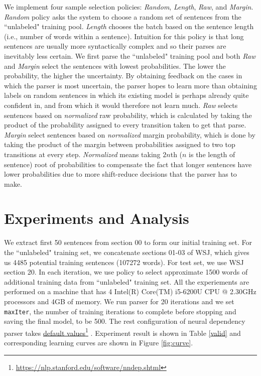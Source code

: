 \documentclass[11pt,letterpaper]{article}
\newcommand\fnurl[2]{%
  \href{#2}{#1}\footnote{\url{#2}}%
}
\begin{document}
We implement four sample selection policies: \emph{Random}, \emph{Length}, \emph{Raw}, and \emph{Margin}. \emph{Random} policy
asks the system to choose a random set of sentences from the ``unlabeled" training pool. \emph{Length} chooses the batch based on
the sentence length (i.e., number of words within a sentence). Intuition for this policy is that 
long sentences are usually more syntactically complex and so their parses are inevitably less certain. 
We first parse the ``unlabeled" training pool and both \emph{Raw} and \emph{Margin} select the sentences
with lowest probabilities. The lower the probability, the higher the uncertainty. By obtaining feedback on the cases 
in which the parser is most uncertain, the parser hopes to learn more than obtaining labels on random sentences in which 
its existing model is perhaps already quite confident in, and from which it would therefore not learn much. 
\emph{Raw} selects sentences based on \emph{normalized} raw probability, which is calculated by taking 
the product of the probability assigned to every transition taken to get that parse.
\emph{Margin} select sentences based on \emph{normalized} margin probability, which is done by
taking the product of the margin between probabilities assigned to two top transitions at every step. 
\emph{Normalized} means taking $2n$th ($n$ is the length of sentence) root of probabilities to compensate the fact
that longer sentences have lower probabilities due to more shift-reduce decisions that the parser has to make.

\section{Experiments and Analysis}
\label{ssec:layout}

We extract first 50 sentences from section 00 to form our initial training set. For the ``unlabeled" training set, 
we concatenate sections 01-03 of WSJ, which gives us 4485 potential training sentences (107272 words). For test set,
we use WSJ section 20. In each iteration, we use policy to select approximate 1500 words of additional training data
from ``unlabeled" training set. All the experiements are performed on
a machine that has 4 Intel(R) Core(TM) i5-6200U CPU @ 2.30GHz processors and 4GB of memory. 
We run parser for 20 iterations and we set \texttt{maxIter}, the number of training iterations to complete before stopping
and saving the final model, to be 500. The rest configuration of neural dependency parser takes \fnurl{default 
values}{https://nlp.stanford.edu/software/nndep.shtml}.
Experiment result is shown in Table \ref{valid} and corresponding learning curves are shown in Figure \ref{fig:curve}.
\end{document}
